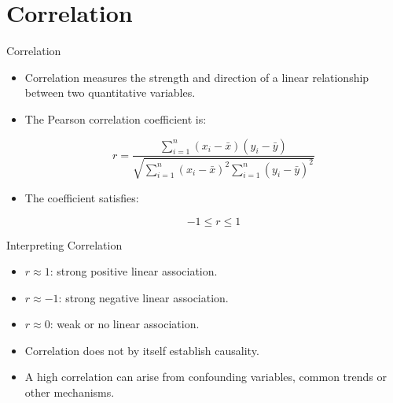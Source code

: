 \documentclass{beamer}
\begin{document}
\section{Correlation}

\begin{frame}{Correlation}

\begin{itemize}

  \item Correlation measures the strength and direction of a linear relationship between two quantitative variables.

  \vskip 0.5cm

  \item The Pearson correlation coefficient is:

\[
r =
\frac{
\sum_{i=1}^{n}
(x_i-\bar{x})(y_i-\bar{y})
}{
\sqrt{
\sum_{i=1}^{n}(x_i-\bar{x})^2
\sum_{i=1}^{n}(y_i-\bar{y})^2
}
}
\]

  \vskip 0.4cm

  \item The coefficient satisfies:

\[
-1 \leq r \leq 1
\]

\end{itemize}

\end{frame}


\begin{frame}{Interpreting Correlation}

\begin{itemize}

  \item $r \approx 1$: strong positive linear association.

  \vskip 0.3cm

  \item $r \approx -1$: strong negative linear association.

  \vskip 0.3cm

  \item $r \approx 0$: weak or no linear association.

  \vskip 0.5cm

  \item Correlation does not by itself establish causality.

  \vskip 0.3cm

  \item A high correlation can arise from confounding variables, common trends or other mechanisms.

\end{itemize}

\end{frame}
\end{document}
